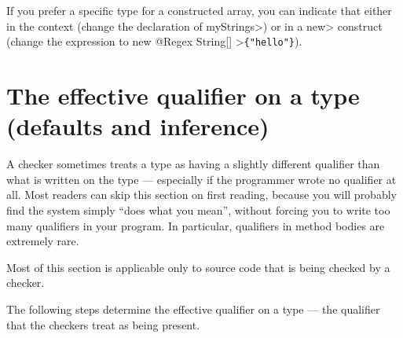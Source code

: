 If you prefer a specific type for a constructed array, you can indicate
that either in the context (change the declaration of \<myStrings>) or in a
\<new> construct (change the expression to \<new @Regex String[] >\verb|{"hello"}|).


\section{The effective qualifier on a type (defaults and inference)\label{effective-qualifier}}

A checker sometimes treats a type as having a slightly different qualifier
than what is written on the type --- especially if the programmer wrote no
qualifier at all.
Most readers can skip this section on first reading, because you will
probably find the system simply ``does what you mean'', without forcing
you to write too many qualifiers in your program.
In particular, qualifiers in method bodies are extremely rare.

Most of this section is applicable only to source code that is being
checked by a checker.

  The following steps determine the effective
qualifier on a type --- the qualifier that the checkers treat as being present.


